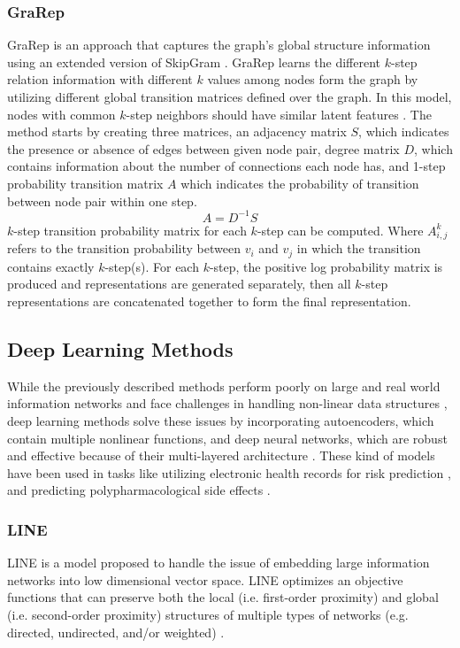 \subsubsection{GraRep}
\ac{GraRep} is an approach that captures the graph’s global structure information using an extended version of SkipGram \cite{cao_grarep:_2015}. \ac{GraRep} learns the different $k$-step relation information with different $k$ values among nodes form the graph by utilizing different global transition matrices defined over the graph. In this model, nodes with common $k$-step neighbors should have similar latent features \cite{cao_grarep:_2015}.
The method starts by creating three matrices, an adjacency matrix $S$, which indicates the presence or absence of edges between given node pair, degree matrix $D$, which contains information about the number of connections each node has, and 1-step probability transition matrix $A$ which indicates the probability of transition between node pair within one step.
\begin{equation} \label{eq:grarep_01}
A = D^{-1}S
\end{equation}
$k$-step transition probability matrix for each $k$-step can be computed. Where $A^{k}_{i,j}$ refers to the transition probability between $v_{i}$ and $v_{j}$ in which the transition contains exactly $k$-step(s). For each $k$-step, the positive log probability matrix is produced and representations are generated separately, then all $k$-step representations are concatenated together to form the final representation.

\subsection{Deep Learning Methods}
While the previously described methods perform poorly on large and real world information networks and face challenges in handling non-linear data structures \cite{cui_survey_2017}, deep learning methods solve these issues by incorporating autoencoders, which contain multiple nonlinear functions,  and deep neural networks, which are robust and effective because of their multi-layered architecture \cite{cai_comprehensive_2017}. These kind of models have been used in tasks like utilizing electronic health records for risk prediction \cite{cheng_risk_2016}, and predicting polypharmacological side effects \cite{zitnik_modeling_2018}.

\subsubsection{LINE}
\ac{LINE} is a model proposed to handle the issue of embedding large information networks into low dimensional vector space. \ac{LINE} optimizes an objective functions that can preserve both the local (i.e. first-order proximity) and global (i.e. second-order proximity) structures of multiple types of networks (e.g. directed, undirected, and/or weighted) \cite{tang_line:_2015}.


